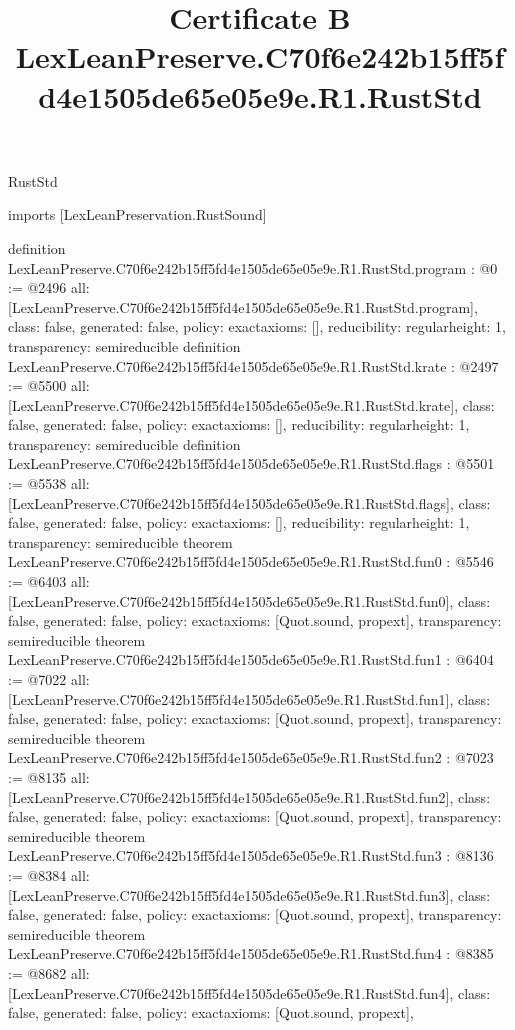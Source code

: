 \begin{lexlean}{RustStd}
\title{Certificate B LexLeanPreserve.C70f6e242b15ff5fd4e1505de65e05e9e.R1.RustStd}
\begin{coremodule}
imports [LexLeanPreservation.RustSound]

definition LexLeanPreserve.C70f6e242b15ff5fd4e1505de65e05e9e.R1.RustStd.program : @0 := @2496 {
  all: [LexLeanPreserve.C70f6e242b15ff5fd4e1505de65e05e9e.R1.RustStd.program],
  class: false,
  generated: false,
  policy: exact{axioms: []},
  reducibility: regular{height: 1},
  transparency: semireducible
}
definition LexLeanPreserve.C70f6e242b15ff5fd4e1505de65e05e9e.R1.RustStd.krate : @2497 := @5500 {
  all: [LexLeanPreserve.C70f6e242b15ff5fd4e1505de65e05e9e.R1.RustStd.krate],
  class: false,
  generated: false,
  policy: exact{axioms: []},
  reducibility: regular{height: 1},
  transparency: semireducible
}
definition LexLeanPreserve.C70f6e242b15ff5fd4e1505de65e05e9e.R1.RustStd.flags : @5501 := @5538 {
  all: [LexLeanPreserve.C70f6e242b15ff5fd4e1505de65e05e9e.R1.RustStd.flags],
  class: false,
  generated: false,
  policy: exact{axioms: []},
  reducibility: regular{height: 1},
  transparency: semireducible
}
theorem LexLeanPreserve.C70f6e242b15ff5fd4e1505de65e05e9e.R1.RustStd.fun0 : @5546 := @6403 {
  all: [LexLeanPreserve.C70f6e242b15ff5fd4e1505de65e05e9e.R1.RustStd.fun0],
  class: false,
  generated: false,
  policy: exact{axioms: [Quot.sound, propext]},
  transparency: semireducible
}
theorem LexLeanPreserve.C70f6e242b15ff5fd4e1505de65e05e9e.R1.RustStd.fun1 : @6404 := @7022 {
  all: [LexLeanPreserve.C70f6e242b15ff5fd4e1505de65e05e9e.R1.RustStd.fun1],
  class: false,
  generated: false,
  policy: exact{axioms: [Quot.sound, propext]},
  transparency: semireducible
}
theorem LexLeanPreserve.C70f6e242b15ff5fd4e1505de65e05e9e.R1.RustStd.fun2 : @7023 := @8135 {
  all: [LexLeanPreserve.C70f6e242b15ff5fd4e1505de65e05e9e.R1.RustStd.fun2],
  class: false,
  generated: false,
  policy: exact{axioms: [Quot.sound, propext]},
  transparency: semireducible
}
theorem LexLeanPreserve.C70f6e242b15ff5fd4e1505de65e05e9e.R1.RustStd.fun3 : @8136 := @8384 {
  all: [LexLeanPreserve.C70f6e242b15ff5fd4e1505de65e05e9e.R1.RustStd.fun3],
  class: false,
  generated: false,
  policy: exact{axioms: [Quot.sound, propext]},
  transparency: semireducible
}
theorem LexLeanPreserve.C70f6e242b15ff5fd4e1505de65e05e9e.R1.RustStd.fun4 : @8385 := @8682 {
  all: [LexLeanPreserve.C70f6e242b15ff5fd4e1505de65e05e9e.R1.RustStd.fun4],
  class: false,
  generated: false,
  policy: exact{axioms: [Quot.sound, propext]},
}
\end{coremodule}
\end{lexlean}

